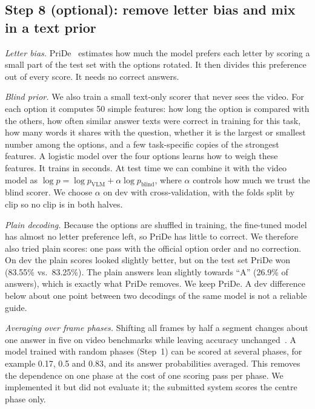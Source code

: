 \subsection{Step 8 (optional): remove letter bias and mix in a text prior}
\label{sec:blind}
\emph{Letter bias.} PriDe~\cite{zheng2024pride} estimates how much the
model prefers each letter by scoring a small part of the test set with the
options rotated. It then divides this preference out of every score. It
needs no correct answers.

\emph{Blind prior.} We also train a small text-only scorer that never sees
the video. For each option it computes 50 simple features: how long the
option is compared with the others, how often similar answer texts were
correct in training for this task, how many words it shares with the
question, whether it is the largest or smallest number among the options,
and a few task-specific copies of the strongest features. A logistic model
over the four options learns how to weigh these features. It trains in
seconds. At test time we can combine it with the video model as
$\log p = \log p_{\text{VLM}} + \alpha \log p_{\text{blind}}$, where
$\alpha$ controls how much we trust the blind scorer. We choose $\alpha$ on
dev with cross-validation, with the folds split by clip so no clip is in
both halves.

\emph{Plain decoding.} Because the options are shuffled in training, the
fine-tuned model has almost no letter preference left, so PriDe has little
to correct. We therefore also tried plain scores: one pass with the official
option order and no correction. On dev the plain scores looked slightly
better, but on the test set PriDe won (83.55\% vs.\ 83.25\%). The plain
answers lean slightly towards ``A'' (26.9\% of answers), which is exactly
what PriDe removes. We keep PriDe. A dev difference below about one point
between two decodings of the same model is not a reliable guide.

\emph{Averaging over frame phases.} Shifting all frames by half a segment
changes about one answer in five on video benchmarks while leaving accuracy
unchanged~\cite{zhu2026phase}. A model trained with random phases (Step~1)
can be scored at several phases, for example 0.17, 0.5 and 0.83, and its
answer probabilities averaged. This removes the dependence on one phase at
the cost of one scoring pass per phase. We implemented it but did not
evaluate it; the submitted system scores the centre phase only.
